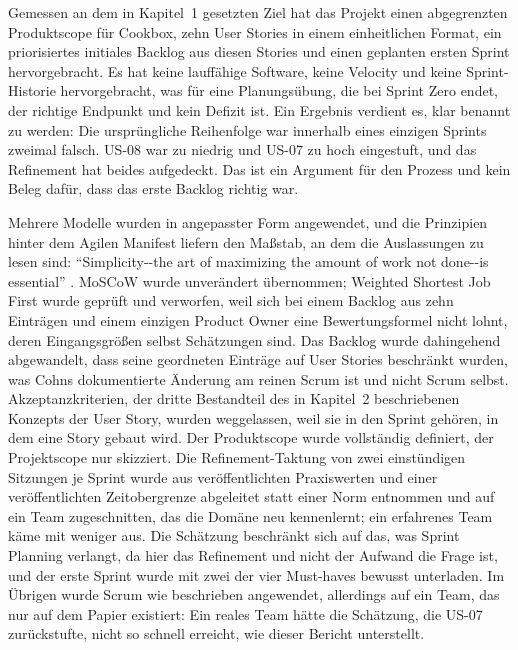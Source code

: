 Gemessen an dem in Kapitel~1 gesetzten Ziel hat das Projekt einen abgegrenzten
Produktscope für Cookbox, zehn User Stories in einem einheitlichen Format, ein
priorisiertes initiales Backlog aus diesen Stories und einen geplanten ersten
Sprint hervorgebracht. Es hat keine lauffähige Software, keine Velocity und
keine Sprint-Historie hervorgebracht, was für eine Planungsübung, die bei Sprint
Zero endet, der richtige Endpunkt und kein Defizit ist. Ein Ergebnis verdient es,
klar benannt zu werden: Die ursprüngliche Reihenfolge war innerhalb eines
einzigen Sprints zweimal falsch. US-08 war zu niedrig und US-07 zu hoch
eingestuft, und das Refinement hat beides aufgedeckt. Das ist ein Argument für
den Prozess und kein Beleg dafür, dass das erste Backlog richtig war.

Mehrere Modelle wurden in angepasster Form angewendet, und die Prinzipien hinter
dem Agilen Manifest liefern den Maßstab, an dem die Auslassungen zu lesen sind:
\enquote{Simplicity-{}-the art of maximizing the amount of work not done-{}-is
essential} \parencite[para.~10]{beck2001principles}. MoSCoW wurde unverändert
übernommen; Weighted Shortest Job First wurde geprüft und verworfen, weil sich
bei einem Backlog aus zehn Einträgen und einem einzigen Product Owner eine
Bewertungsformel nicht lohnt, deren Eingangsgrößen selbst Schätzungen sind. Das
Backlog wurde dahingehend abgewandelt, dass seine geordneten Einträge auf User
Stories beschränkt wurden, was Cohns dokumentierte Änderung am reinen Scrum ist
und nicht Scrum selbst. Akzeptanzkriterien, der dritte Bestandteil des in
Kapitel~2 beschriebenen Konzepts der User Story, wurden weggelassen, weil sie in
den Sprint gehören, in dem eine Story gebaut wird. Der Produktscope wurde
vollständig definiert, der Projektscope nur skizziert. Die Refinement-Taktung von
zwei einstündigen Sitzungen je Sprint wurde aus veröffentlichten Praxiswerten und
einer veröffentlichten Zeitobergrenze abgeleitet statt einer Norm entnommen und
auf ein Team zugeschnitten, das die Domäne neu kennenlernt; ein erfahrenes Team
käme mit weniger aus. Die Schätzung beschränkt sich auf das, was Sprint Planning
verlangt, da hier das Refinement und nicht der Aufwand die Frage ist, und der
erste Sprint wurde mit zwei der vier Must-haves bewusst unterladen. Im Übrigen
wurde Scrum wie beschrieben angewendet, allerdings auf ein Team, das nur auf dem
Papier existiert: Ein reales Team hätte die Schätzung, die US-07 zurückstufte,
nicht so schnell erreicht, wie dieser Bericht unterstellt.

